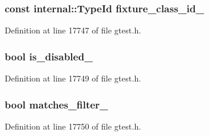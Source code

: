 \hypertarget{classtesting_1_1TestInfo_a6ab2218f8bfd984d35e06969ca95abc8}{
\subsubsection[{fixture\-\_\-class\-\_\-id\-\_\-}]{\setlength{\rightskip}{0pt plus 5cm}const {\bf internal\-::\-Type\-Id} {\bf fixture\-\_\-class\-\_\-id\-\_\-}}}\label{df/d65/classtesting_1_1TestInfo_a6ab2218f8bfd984d35e06969ca95abc8}


\-Definition at line 17747 of file gtest.\-h.

\hypertarget{classtesting_1_1TestInfo_a461785b0a586f2fa2c146f1599293015}{
\subsubsection[{is\-\_\-disabled\-\_\-}]{\setlength{\rightskip}{0pt plus 5cm}bool {\bf is\-\_\-disabled\-\_\-}}}\label{df/d65/classtesting_1_1TestInfo_a461785b0a586f2fa2c146f1599293015}


\-Definition at line 17749 of file gtest.\-h.

\hypertarget{classtesting_1_1TestInfo_aff50a5d6360f8193a19682c01593b42b}{
\subsubsection[{matches\-\_\-filter\-\_\-}]{\setlength{\rightskip}{0pt plus 5cm}bool {\bf matches\-\_\-filter\-\_\-}}}\label{df/d65/classtesting_1_1TestInfo_aff50a5d6360f8193a19682c01593b42b}


\-Definition at line 17750 of file gtest.\-h.

